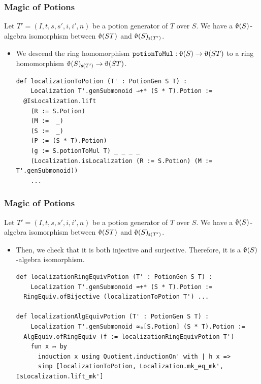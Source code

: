 \documentclass[9pt]{beamer}
\begin{document}
\begin{frame}[fragile]
  \frametitle{Magic of Potions}
\begin{theorem}
  Let $T' = \left( I, t, s, s', i, i', n \right)$ be a potion generator of $T$ over $S$.
  We have a $\operatorname{\upvartheta}(S)$-algebra isomorphism between $\operatorname{\upvartheta}( ST )$ and $\operatorname{\upvartheta}(S)_{\mathsf{s}(T')}$.
\end{theorem}

\begin{itemize}
  \item We descend the ring homomorphism ${\footnotesize{\mathtt{potionToMul}}} : \operatorname{\upvartheta}(S) \to \operatorname{\upvartheta}(ST)$ to a ring homomorphism $\operatorname{\upvartheta}(S)_{\mathsf{s}(T')} \to \operatorname{\upvartheta}(ST)$.
  \begin{lstlisting}
def localizationToPotion (T' : PotionGen S T) :
    Localization T'.genSubmonoid →+* (S * T).Potion :=
  @IsLocalization.lift
    (R := S.Potion)
    (M :=  _)
    (S :=  _)
    (P := (S * T).Potion)
    (g := S.potionToMul T) _ _ _ _
    (Localization.isLocalization (R := S.Potion) (M := T'.genSubmonoid)) 
    ...
  \end{lstlisting}
\end{itemize}

\end{frame}



\begin{frame}[fragile]
  \frametitle{Magic of Potions}
\begin{theorem}
  Let $T' = \left( I, t, s, s', i, i', n \right)$ be a potion generator of $T$ over $S$.
  We have a $\operatorname{\upvartheta}(S)$-algebra isomorphism between $\operatorname{\upvartheta}( ST )$ and $\operatorname{\upvartheta}(S)_{\mathsf{s}(T')}$.
\end{theorem}

\begin{itemize}
  \item Then, we check that it is both injective and surjective. Therefore, it is a $\operatorname{\upvartheta}(S)$-algebra isomorphism.
  \begin{lstlisting}[extendedchars=true]
def localizationRingEquivPotion (T' : PotionGen S T) :
    Localization T'.genSubmonoid ≃+* (S * T).Potion :=
  RingEquiv.ofBijective (localizationToPotion T') ...

def localizationAlgEquivPotion (T' : PotionGen S T) :
    Localization T'.genSubmonoid ≃ₐ[S.Potion] (S * T).Potion :=
  AlgEquiv.ofRingEquiv (f := localizationRingEquivPotion T') 
    fun x ↦ by
      induction x using Quotient.inductionOn' with | h x =>
      simp [localizationToPotion, Localization.mk_eq_mk', IsLocalization.lift_mk']
\end{lstlisting}
\end{itemize}

\end{frame}
\end{document}
